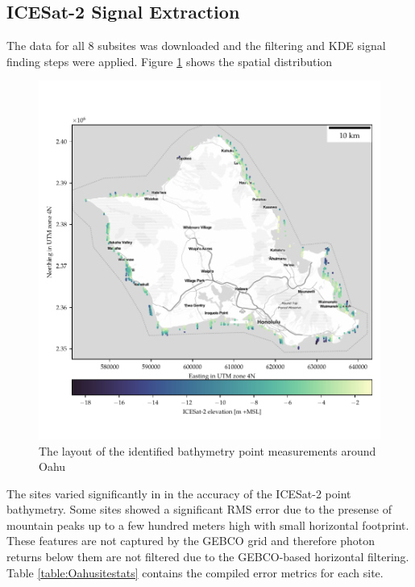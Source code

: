 \subsection{ICESat-2 Signal Extraction}

The data for all 8 subsites was downloaded and the filtering and KDE signal finding steps were applied. Figure \ref{fig:oahu-all-photon-map} shows the spatial distribution

\begin{figure}[h]
    \centering
    \includegraphics[width=\textwidth]{figures/Oahu_all_sites_photon_points.pdf}
    \caption{The layout of the identified bathymetry point measurements around Oahu}
    \label{fig:oahu-all-photon-map}
\end{figure}

The sites varied significantly in in the accuracy of the ICESat-2 point bathymetry. Some sites showed a significant RMS error due to the presense of mountain peaks up to a few hundred meters high with small horizontal footprint. These features are not captured by the GEBCO grid and therefore photon returns below them are not filtered due to the GEBCO-based horizontal filtering. Table \ref{table:Oahusitestats} contains the compiled error metrics for each site.

 

